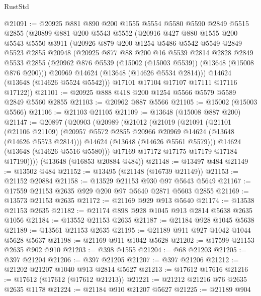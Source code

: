 \begin{lexlean}{RustStd}
\begin{coremodule}
@21091 := @20925
    @881
    @890
    @200
    @1555
    @5554
    @5580
    @5590
    @2849
    @5515
    @2855
    (@20899
      @881
      @200
      @5543
      @5552
      (@20916
        @427
        @880
        @1555
        @200
        @5543
        @5550
        @3911
        (@20926
          @879
          @200
          @1254
          @5486
          @5542
          @5549
          @2849
          @5523
          @2855
          @20948
          (@20925
            @877
            @88
            @200
            @16
            @5539
            @2814
            @2828
            @2849
            @5533
            @2855
            (@20962 @876 @5539 (@15002 (@15003 @5539)) (@13648 (@15008 @876 @200)))
            @20969
            @14624
            (@13648 (@14626 @5534 @2814)))
          @14624
          (@13648 (@14626 @5524 @5542)))
        @17101
        @17104
        @17107
        @17111
        @17116
        @17122))
@21101 := @20925 @888 @418 @200 @1254 @5566 @5579 @5589 @2849 @5560 @2855
@21103 := @20962 @887 @5566
@21105 := @15002 (@15003 @5566)
@21106 := @21103 @21105
@21109 := @13648 (@15008 @887 @200)
@21147 := @20897
    (@20903
      (@20989
        (@21012
          (@21019
            (@21091
              (@21101
                (@21106 @21109)
                (@20957 @5572 @2855 @20966 @20969 @14624 (@13648 (@14626 @5573 @2814)))
                @14624
                (@13648 (@14626 @5561 @5579)))
              @14624
              (@13648 (@14626 @5516 @5580)))
            @17169
            @17172
            @17175
            @17179
            @17184
            @17190))))
    (@13648 (@16853 @20884 @484))
@21148 := @13497 @484
@21149 := @13502 @484
@21152 := @13495 (@21148 (@16739 @21149))
@21153 := @21152 @20884
@21158 := @13529 @21153 @930 @97 @5643 @5649
@21167 := @17559 @21153 @2635 @929 @200 @97 @5640 @2871 @5603 @2855
@21169 := @13573 @21153 @2635
@21172 := @21169 @929 @913 @5640
@21174 := @13538 @21153 @2635
@21182 := @21174 @898 @928 @1045 @913 @2814 @5638 @2635 @1056
@21184 := @13552 @21153 @2635
@21187 := @21184 @928 @1045 @5638
@21189 := @13561 @21153 @2635
@21195 := @21189 @911 @927 @1042 @1044 @5628 @5637
@21198 := @21169 @911 @1042 @5628
@21202 := @17599 @21153 @2635 @902 @910
@21203 := @398 @1555
@21204 := @68 @21203
@21205 := @397 @21204
@21206 := @397 @21205
@21207 := @397 @21206
@21212 := @21202 @21207 @1040 @913 @2814 @5627
@21213 := @17612 @17616
@21216 := @17612 (@17612 (@17612 @21213))
@21221 := @21212 @21216 @76 @2635 @2635 @1178
@21224 := @21184 @910 @21207 @5627
@21225 := @21189 @904

\end{coremodule}
\end{lexlean}
